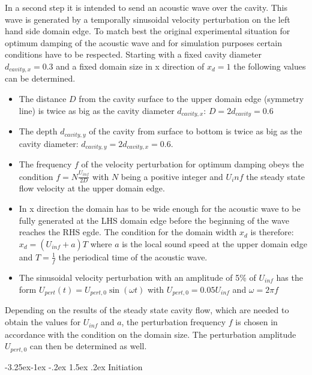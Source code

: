 \documentclass[11pt,a4paper,twoside]{report}
\makeatletter
\renewcommand\paragraph{\@startsection{paragraph}{4}{\z@}%
  {-3.25ex\@plus -1ex \@minus -.2ex}%
  {1.5ex \@plus .2ex}%
  {\normalfont\normalsize\bfseries}}
\makeatother
\begin{document}
In a second step it is intended to send an acoustic wave over the cavity. This wave is generated by a temporally sinusoidal velocity perturbation on the left hand side domain edge. To match best the original experimental situation for optimum damping of the acoustic wave and for simulation purposes certain conditions have to be respected.
Starting with a fixed cavity diameter $d_\mathit{cavity,x}=0.3$ and a fixed domain size in x direction of $x_d=1$ the following values can be determined.
\begin{itemize}
 \item The distance $D$ from the cavity surface to the upper domain edge (symmetry line) is twice as big as the cavity diameter $d_\mathit{cavity,x}$: $D=2d_\mathit{cavity}=0.6$
\item The depth $d_\mathit{cavity,y}$ of the cavity from surface to bottom is twice as big as the cavity diameter: $d_\mathit{cavity,y}=2d_\mathit{cavity,x}=0.6$. 
\item The frequency $f$ of the velocity perturbation for optimum damping obeys the condition $f=N\frac{U_\mathit{inf}}{2 D}$ with $N$ being a positive integer and $U_inf$ the steady state flow velocity at the upper domain edge.
\item In x direction the domain has to be wide enough for the acoustic wave to be fully generated at the LHS domain edge before the beginning of the wave reaches the RHS egde.
The condition for the domain width $x_d$ is therefore: $x_d=(U_\mathit{inf}+a)T$ where $a$ is the local sound speed at the upper domain edge and $T=\frac{1}{f}$ the periodical time of the acoustic wave. 
\item The sinusoidal velocity perturbation with an amplitude of 5\% of $U_\mathit{inf}$ has the form $ U_\mathit{pert}(t)=U_\mathit{pert,0}\sin(\omega t)$ with $U_\mathit{pert,0}=0.05 U_\mathit{inf}$ and $\omega=2\pi f$
 
\end{itemize}
Depending on the results of the steady state cavity flow, which are needed to obtain the values for $U_\mathit{inf}$ and $a$, the perturbation frequency $f$ is chosen in accordance with the condition on the domain size. The perturbation amplitude $U_\mathit{pert,0}$ can then be determined as well.

\paragraph {Initiation}
\end{document}

